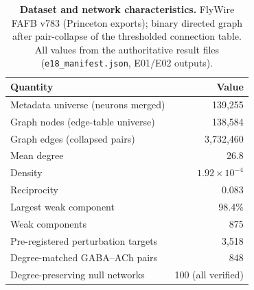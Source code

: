 \begin{table}[htbp]
\centering
\small
\caption{\textbf{Dataset and network characteristics.} FlyWire FAFB v783 (Princeton exports); binary directed graph after pair-collapse of the thresholded connection table. All values from the authoritative result files (\texttt{e18\_manifest.json}, E01/E02 outputs).}\label{tab:network}
\begin{tabular}{lr}
\hline
\textbf{Quantity} & \textbf{Value} \\
\hline
Metadata universe (neurons merged) & 139,255 \\
Graph nodes (edge-table universe) & 138,584 \\
Graph edges (collapsed pairs) & 3,732,460 \\
Mean degree & 26.8 \\
Density & $1.92\times10^{-4}$ \\
Reciprocity & 0.083 \\
Largest weak component & 98.4\% \\
Weak components & 875 \\
Pre-registered perturbation targets & 3,518 \\
Degree-matched GABA--ACh pairs & 848 \\
Degree-preserving null networks & 100 (all verified) \\
\hline
\end{tabular}
\end{table}
